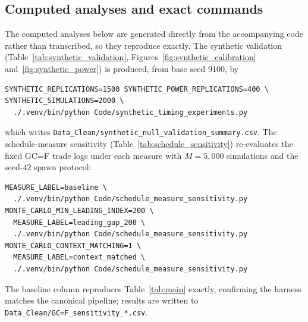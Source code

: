 \documentclass[preprint,12pt]{elsarticle}
\theoremstyle{definition}
\begin{document}
\subsection{Computed analyses and exact commands}

The computed analyses below are generated directly from the accompanying code rather than transcribed, so they reproduce exactly. The synthetic validation (Table~\ref{tab:synthetic_validation}, Figures~\ref{fig:synthetic_calibration} and~\ref{fig:synthetic_power}) is produced, from base seed $9100$, by
\begin{verbatim}
SYNTHETIC_REPLICATIONS=1500 SYNTHETIC_POWER_REPLICATIONS=400 \
SYNTHETIC_SIMULATIONS=2000 \
  ./.venv/bin/python Code/synthetic_timing_experiments.py
\end{verbatim}
which writes \texttt{Data\_Clean/synthetic\_null\_validation\_summary.csv}. The schedule-measure sensitivity (Table~\ref{tab:schedule_sensitivity}) re-evaluates the fixed GC=F trade logs under each measure with $M=5{,}000$ simulations and the seed-$42$ spawn protocol:
\begin{verbatim}
MEASURE_LABEL=baseline \
  ./.venv/bin/python Code/schedule_measure_sensitivity.py
MONTE_CARLO_MIN_LEADING_INDEX=200 \
  MEASURE_LABEL=leading_gap_200 \
  ./.venv/bin/python Code/schedule_measure_sensitivity.py
MONTE_CARLO_CONTEXT_MATCHING=1 \
  MEASURE_LABEL=context_matched \
  ./.venv/bin/python Code/schedule_measure_sensitivity.py
\end{verbatim}
The baseline column reproduces Table~\ref{tab:main} exactly, confirming the harness matches the canonical pipeline; results are written to \texttt{Data\_Clean/\allowbreak GC=F\_sensitivity\_*.csv}.
\end{document}
